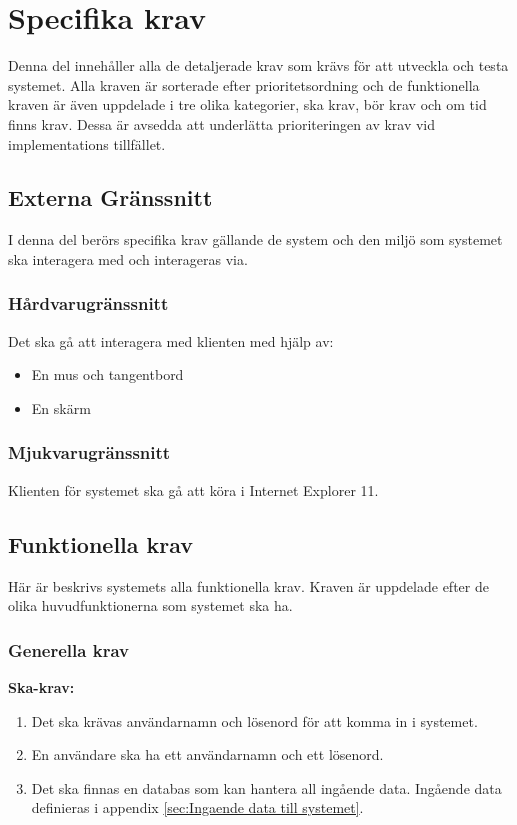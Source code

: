 \documentclass[twoside]{article}
\begin{document}
\section{Specifika krav}
\label{sec:Specifika krav}
Denna del innehåller alla de detaljerade krav som krävs för att utveckla och
testa systemet. Alla kraven är sorterade efter prioritetsordning och de
funktionella kraven är även
uppdelade i tre olika kategorier, ska krav, bör krav och om tid finns krav.
Dessa är avsedda att underlätta prioriteringen av krav vid implementations
tillfället.

\subsection{Externa Gränssnitt}
\label{subsec:Externa Granssnitt}
I denna del berörs specifika krav gällande de system och den miljö som systemet
ska interagera med och interageras via.

\subsubsection{Hårdvarugränssnitt}
\label{subsec:EG-Hardvarugranssnitt}
Det ska gå att interagera med klienten med hjälp av:
\begin{itemize}
  \item En mus och tangentbord
  \item En skärm
\end{itemize}
\subsubsection{Mjukvarugränssnitt}

\label{subsec:EG-Mjukvarugranssnitt}
Klienten för systemet ska gå att köra i Internet Explorer 11.

\subsection{Funktionella krav}
\label{subsec:Funktionellakrav}
Här är beskrivs systemets alla funktionella krav. Kraven är uppdelade efter de
olika huvudfunktionerna som systemet ska ha.
\label{subsec:Funktionella krav}
\subsubsection{Generella krav}
\label{subsec:Generella krav}
\textbf{Ska-krav: }
\begin{enumerate}
    \item Det ska krävas användarnamn och lösenord för att komma in i systemet.
    \item En användare ska ha ett användarnamn och ett lösenord.
    \item Det ska finnas en databas som kan hantera all ingående data.
    Ingående data definieras i appendix \ref{sec:Ingaende data till systemet}.
\end{enumerate}
\end{document}
